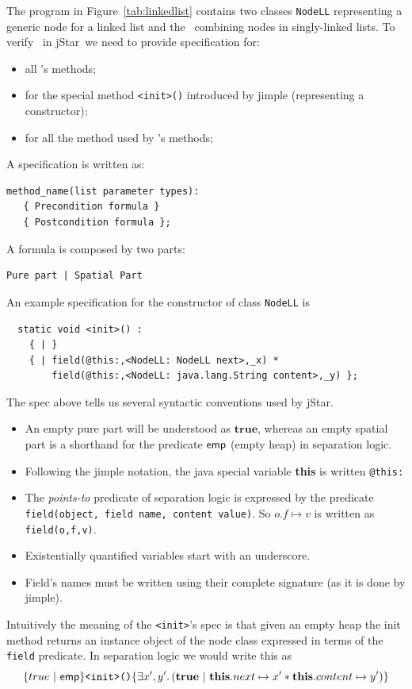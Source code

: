 \documentclass[11pt]{article}
\newcommand{\jStar}{{\sf jStar}}
\newcommand{\psto}{\mapsto}
\newcommand{\emp}{{\sf emp}}
\newcommand{\true}{\mathbf{true}}
\newcommand{\this}{\mathbf{this}}
\begin{document}
The program in Figure~\ref{tab:linkedlist} contains two classes
{\tt NodeLL}  representing a generic node for a linked list
and the \linkedlist \  combining nodes in 
singly-linked lists. To verify  \linkedlist \ in \jStar \ we
need to provide specification for:
\begin{itemize}
\item all
\linkedlist's methods;
\item for the special method {\tt <init>()} introduced by jimple
  (representing a constructor);
\item for all the method used by \linkedlist's methods;
\end{itemize}
A specification is written as:
\begin{verbatim}
method_name(list parameter types): 
   { Precondition formula } 
   { Postcondition formula };
\end{verbatim}
A formula is composed by two parts:
\begin{verbatim}
Pure part | Spatial Part
\end{verbatim}
An example specification for the constructor of class {\tt NodeLL} is
\begin{verbatim}
  static void <init>() : 
    { | } 
    { | field(@this:,<NodeLL: NodeLL next>,_x) * 
        field(@this:,<NodeLL: java.lang.String content>,_y) };
\end{verbatim}
The spec above tells us several syntactic conventions used by \jStar.
\begin{itemize}
\item An empty pure part will be understood as $\true$, whereas an empty
spatial part is a shorthand for the predicate
$\emp$ (empty heap) in separation logic. 
\item Following the jimple notation, the java special variable {\bf
    this} is written {\tt @this:}
\item The {\em points-to} predicate of separation logic is expressed by the
  predicate {\tt field(object, field name, content value)}. So $o.f
  \psto v$ is written as {\tt field(o,f,v)}.
\item Existentially quantified variables start with an underscore.
\item Field's names must be written using their complete signature (as
  it is done by jimple).
\end{itemize}
Intuitively the meaning of the {\tt <init>}'s spec is that given an
empty heap the init method returns an instance object of the node
class expressed in terms of the {\tt field} predicate.  In separation
logic we would write this as
\[
\{ true \ | \ \emp \} \texttt{<init>()} \{\exists x',y'.\, (\true \ | \ \this.next \psto x' * \this.content \psto y') \}
\]
\end{document}
